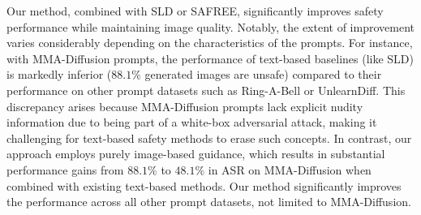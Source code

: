 %

Our method, combined with SLD or SAFREE, significantly improves safety performance while maintaining image quality. Notably, the extent of improvement varies considerably depending on the characteristics of the prompts. For instance, with MMA-Diffusion prompts, %
the performance of text-based baselines (like SLD) is markedly inferior ($88.1\%$ generated images are unsafe) compared to their performance on other prompt datasets such as Ring-A-Bell or UnlearnDiff. This discrepancy arises because MMA-Diffusion prompts lack explicit nudity information due to being part of a white-box adversarial attack, making it challenging for text-based safety methods to erase such concepts. In contrast, our approach employs purely image-based guidance, which results in substantial performance gains from $88.1\%$ to $48.1\%$ in ASR on MMA-Diffusion when combined with existing text-based methods. Our method significantly improves the performance across all other prompt datasets, not limited to MMA-Diffusion.

